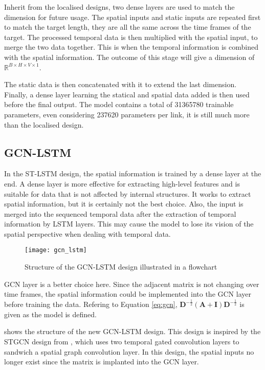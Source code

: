 Inherit from the localised designs, two dense layers are used to match the dimension for future usage. 
The spatial inputs and static inputs are repeated first to match the target length, they are all the same across the time frames of the target. 
The processed temporal data is then multiplied with the spatial input, to merge the two data together. This is when the temporal information is combined with the spatial information.
The outcome of this stage will give a dimension of $\mathbb{R}^{B\times H\times V\times 1}$. 

The static data is then concatenated with it to extend the last dimension. Finally, a dense layer learning the statical and spatial data added is then used before the final output. 
The model contains a total of 31365780 trainable parameters, even considering 237620 parameters per link, it is still much more than the localised design. 

\subsection{GCN-LSTM}

In the ST-LSTM design, the spatial information is trained by a dense layer at the end. 
A dense layer is more effective for extracting high-level features and is suitable for data that is not affected by internal structures.
It works to extract spatial information, but it is certainly not the best choice.
Also, the input is merged into the sequenced temporal data after the extraction of temporal information by LSTM layers. 
This may cause the model to lose its vision of the spatial perspective when dealing with temporal data. 

\begin{figure}[!htb]
    \centering
    \texttt{[image: gcn\_lstm]}
    \caption{Structure of the GCN-LSTM design illustrated in a flowchart}
    \label{Figure:gcn_lstm}
\end{figure}

GCN layer is a better choice here. Since the adjacent matrix is not changing over time frames, the spatial information could be implemented into the GCN layer before training the data. 
Refering to Equation \ref{eq:gcn}, $\mathbf{D}^{-\frac{1}{2}}(\mathbf{A} + \mathbf{I})\mathbf{D}^{-\frac{1}{2}}$ is given as the model is defined.

 shows the structure of the new GCN-LSTM design. 
This design is inspired by the STGCN design from \cite{Yu_2018}, which uses two temporal gated convolution layers to sandwich a spatial graph convolution layer.
In this design, the spatial inputs no longer exist since the matrix is implanted into the GCN layer. 

